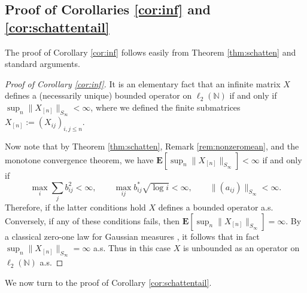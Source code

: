 \documentclass[10pt,reqno]{amsart}
\theoremstyle{definition}
\numberwithin{equation}{section}
\numberwithin{figure}{section}
\numberwithin{table}{section}
\begin{document}
\subsection{Proof of Corollaries \ref{cor:inf} and \ref{cor:schattentail}}

The proof of Corollary \ref{cor:inf} follows easily from
Theorem \ref{thm:schatten} and standard arguments.

\begin{proof}[Proof of Corollary \ref{cor:inf}]
It is an elementary fact \cite[section II.26]{AG93} that an infinite 
matrix $X$ defines a (necessarily unique) bounded operator on 
$\ell_2(\mathbb{N})$  
if and only if $\sup_n\|X_{[n]}\|_{S_\infty}<\infty$, where we defined the 
finite submatrices $X_{[n]}:=(X_{ij})_{i,j\le n}$.

Now note that by Theorem \ref{thm:schatten}, Remark \ref{rem:nonzeromean}, 
and the monotone convergence theorem, we have
$\mathbf{E}[\sup_n\|X_{[n]}\|_{S_\infty}]<\infty$ if and only if
$$
	\max_i\sum_j b_{ij}^2 <\infty,\qquad
	\max_{ij}b_{ij}^*\sqrt{\log i}<\infty,\qquad
	\|(a_{ij})\|_{S_\infty}<\infty.
$$
Therefore, if the latter conditions hold $X$ defines a bounded operator 
a.s. Conversely, if any of these conditions fails, then 
$\mathbf{E}[\sup_n\|X_{[n]}\|_{S_\infty}]=\infty$. By a classical zero-one 
law for Gaussian measures \cite{LS70}, it follows that in fact 
$\sup_n\|X_{[n]}\|_{S_\infty}=\infty$ a.s. Thus in this case $X$ is 
unbounded as an operator on $\ell_2(\mathbb{N})$ a.s.
\end{proof}

We now turn to the proof of Corollary \ref{cor:schattentail}.
\end{document}
